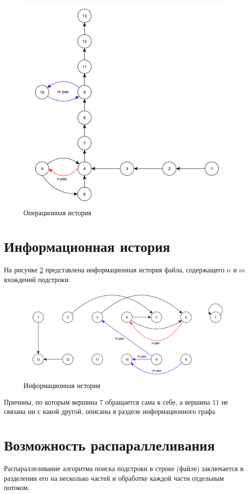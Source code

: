 \begin{figure}[h]
	\centering
	\includegraphics[height=0.6\textheight]{images/ОИ.pdf}
	\caption{Операционная история}
	\label{fg:oi}
\end{figure}

\clearpage

\section{Информационная история}

На рисунке \ref{fg:ii} представлена информационная история файла, содержащего $n$ и $m$ вхождений подстроки. 

\begin{figure}[h]
	\centering
	\includegraphics[height=0.27\textheight]{images/ИИ.pdf}
	\caption{Информационная история}
	\label{fg:ii}
\end{figure}

Причины, по которым вершина 7 обращается сама к себе, а вершина 11 не связана ни с какой другой, описаны в разделе информационного графа.

\section*{Возможность распараллеливания}
Распараллеливание алгоритма поиска подстроки в строке (файле) заключается в разделении его на несколько частей и обработке каждой части отдельным потоком.
